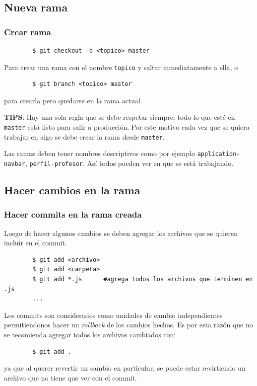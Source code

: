 \documentclass[10pt]{beamer}
\begin{document}
\subsection{Nueva rama}
\begin{frame}[fragile]
	\frametitle{Crear rama}

	\begin{lstlisting}
		$ git checkout -b <topico> master
	\end{lstlisting}

	Para crear una rama con el nombre \texttt{topico} y saltar inmediatamente a 
	ella, o

	\begin{lstlisting}
		$ git branch <topico> master
	\end{lstlisting}

	para crearla pero quedarse en la rama actual.

	\textbf{TIPS}: Hay una sola regla que se debe respetar siempre: todo lo que 
	esté en \texttt{master} está listo para salir a producción. Por este motivo 
	cada vez que se quiera trabajar en algo se debe crear la rama desde 
	\texttt{master}.

	Las ramas deben tener nombres descriptivos como por ejemplo 
	\texttt{application-navbar}, \texttt{perfil-profesor}. Así todos pueden ver 
	en que se está trabajando.
\end{frame} 

\subsection{Hacer cambios en la rama}
\begin{frame}[fragile]
	\frametitle{Hacer commits en la rama creada}

	Luego de hacer algunos cambios se deben agregar los archivos que se quieren 
	incluir en el commit.

	\begin{lstlisting}
		$ git add <archivo>
		$ git add <carpeta>
		$ git add *.js      #agrega todos los archivos que terminen en .js
		...
	\end{lstlisting}

	Los commits son considerados como unidades de cambio independientes 
	permitiendonos hacer un \emph{rollback} de los cambios hechos. Es por esta 
	razón que no se recomienda agregar todos los archivos cambiados con:


	\begin{lstlisting}
		$ git add .
	\end{lstlisting}

	ya que al querer revertir un cambio en particular, se puede estar 
	revirtiendo un archivo que no tiene que ver con el commit.
\end{frame} 
\end{document}
